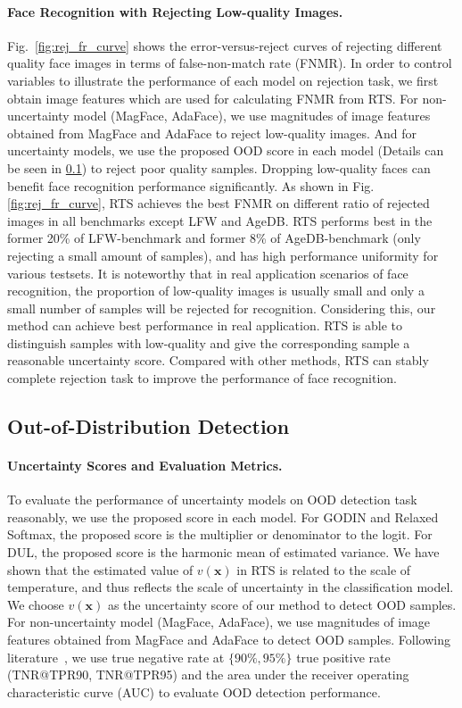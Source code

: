 \documentclass[letterpaper]{article} %
\begin{document}
\paragraph{Face Recognition with Rejecting Low-quality Images.}
Fig.~\ref{fig:rej_fr_curve} shows the error-versus-reject curves of rejecting different quality face images in terms of false-non-match rate (FNMR). In order to control variables to illustrate the performance of each model on rejection task, we first obtain image features which are used for calculating FNMR from RTS. For non-uncertainty model (MagFace, AdaFace), we use magnitudes of image features obtained from MagFace and AdaFace to reject low-quality images. And for uncertainty models, we use the proposed OOD score in each model (Details can be seen in \ref{ssec:ood}) to reject poor quality samples. Dropping low-quality faces can benefit face recognition performance significantly. As shown in Fig.\ref{fig:rej_fr_curve}, RTS achieves the best FNMR on different ratio of rejected images in all benchmarks except LFW and AgeDB. RTS performs best in the former 20\% of LFW-benchmark and former 8\% of AgeDB-benchmark (only rejecting a small amount of samples), and has high performance uniformity for various testsets. It is noteworthy that in real application scenarios of face recognition, the proportion of low-quality images is usually small and only a small number of samples will be rejected for recognition. Considering this, our method can achieve best performance in real application. RTS is able to distinguish samples with low-quality and give the corresponding sample a reasonable uncertainty score. Compared with other methods, RTS can stably complete rejection task to improve the performance of face recognition.










\subsection{Out-of-Distribution Detection}
\label{ssec:ood}
\paragraph{Uncertainty Scores and Evaluation Metrics.}
To evaluate the performance of uncertainty models on OOD detection task reasonably, we use the proposed score in each model. For GODIN and Relaxed Softmax, the proposed score is the multiplier or denominator to the logit. For DUL, the proposed score is the harmonic mean of estimated variance. We have shown that the estimated value of $v(\bm{x})$ in RTS is related to the scale of temperature, and thus reflects the scale of uncertainty in the classification model. We choose $v(\bm{x})$ as the uncertainty score of our method to detect OOD samples. For non-uncertainty model (MagFace, AdaFace), we use magnitudes of image features obtained from MagFace and AdaFace to detect OOD samples.
Following literature~\cite{hsu2020generalized}, we use true negative rate at $\{90\%, 95\%\}$ true positive rate (TNR@TPR90, TNR@TPR95) and the area under the receiver operating characteristic curve (AUC) to evaluate OOD detection performance.
\end{document}
